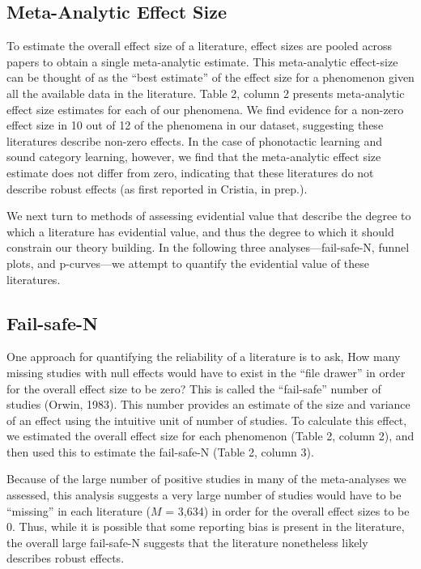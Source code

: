 \documentclass[9pt,twocolumn,twoside,lineno]{pnas-new}
\begin{document}
\subsection*{Meta-Analytic Effect Size}\label{meta-analytic-effect-size}

To estimate the overall effect size of a literature, effect sizes are
pooled across papers to obtain a single meta-analytic estimate. This
meta-analytic effect-size can be thought of as the \enquote{best
estimate} of the effect size for a phenomenon given all the available
data in the literature. Table 2, column 2 presents meta-analytic effect
size estimates for each of our phenomena. We find evidence for a
non-zero effect size in 10 out of 12 of the phenomena in our dataset,
suggesting these literatures describe non-zero effects. In the case of
phonotactic learning and sound category learning, however, we find that
the meta-analytic effect size estimate does not differ from zero,
indicating that these literatures do not describe robust effects (as
first reported in Cristia, in prep.).

We next turn to methods of assessing evidential value that describe the
degree to which a literature has evidential value, and thus the degree
to which it should constrain our theory building. In the following three
analyses---fail-safe-N, funnel plots, and p-curves---we attempt to
quantify the evidential value of these literatures.



\subsection*{Fail-safe-N}\label{fail-safe-n}

One approach for quantifying the reliability of a literature is to ask,
How many missing studies with null effects would have to exist in the
\enquote{file drawer} in order for the overall effect size to be zero?
This is called the \enquote{fail-safe} number of studies (Orwin, 1983).
This number provides an estimate of the size and variance of an effect
using the intuitive unit of number of studies. To calculate this effect,
we estimated the overall effect size for each phenomenon (Table 2,
column 2), and then used this to estimate the fail-safe-N (Table 2,
column 3).

Because of the large number of positive studies in many of the
meta-analyses we assessed, this analysis suggests a very large number of
studies would have to be \enquote{missing} in each literature (\(M\) =
3,634) in order for the overall effect sizes to be 0. Thus, while it is
possible that some reporting bias is present in the literature, the
overall large fail-safe-N suggests that the literature nonetheless
likely describes robust effects.
\end{document}
